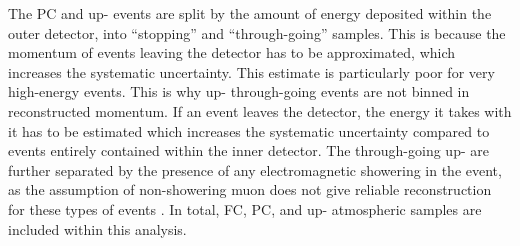 The PC and up-\quickmath{\mu} events are split by the amount of energy deposited within the outer detector, into ``stopping'' and ``through-going'' samples. This is because the momentum of events leaving the detector has to be approximated, which increases the systematic uncertainty. This estimate is particularly poor for very high-energy events. This is why up-\quickmath{\mu} through-going events are not binned in reconstructed momentum. If an event leaves the detector, the energy it takes with it has to be estimated which increases the systematic uncertainty compared to events entirely contained within the inner detector. The through-going up-\quickmath{\mu} are further separated by the presence of any electromagnetic showering in the event, as the assumption of non-showering muon does not give reliable reconstruction for these types of events \cite{Ashie_2005}. In total,  FC,  PC, and  up-\quickmath{\mu} atmospheric samples are included within this analysis.

